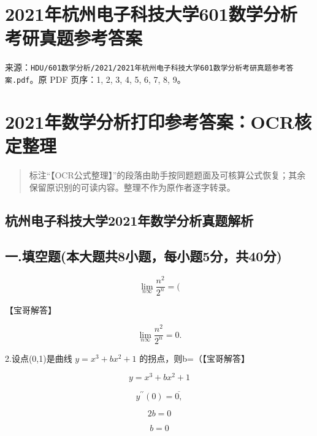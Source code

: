 \documentclass[11pt,fontset=fandol]{ctexart}
\begin{document}
\section{2021年杭州电子科技大学601数学分析考研真题参考答案}\label{ux5e74ux676dux5ddeux7535ux5b50ux79d1ux6280ux5927ux5b66601ux6570ux5b66ux5206ux6790ux8003ux7814ux771fux9898ux53c2ux8003ux7b54ux6848}

来源：\texttt{HDU/601数学分析/2021/2021年杭州电子科技大学601数学分析考研真题参考答案.pdf}。原
PDF 页序：1, 2, 3, 4, 5, 6, 7, 8, 9。

\section{2021年数学分析打印参考答案：OCR核定整理}\label{ux5e74ux6570ux5b66ux5206ux6790ux6253ux5370ux53c2ux8003ux7b54ux6848ocrux6838ux5b9aux6574ux7406}

\begin{quote}
标注``【OCR公式整理】''的段落由助手按同题题面及可核算公式恢复；其余保留原识别的可读内容。整理不作为原作者逐字转录。
\end{quote}

\subsection{杭州电子科技大学2021年数学分析真题解析}\label{ux676dux5ddeux7535ux5b50ux79d1ux6280ux5927ux5b662021ux5e74ux6570ux5b66ux5206ux6790ux771fux9898ux89e3ux6790}

\subsection{一.填空题(本大题共8小题，每小题5分，共40分)}\label{ux4e00.ux586bux7a7aux9898ux672cux5927ux9898ux51718ux5c0fux9898ux6bcfux5c0fux98985ux5206ux517140ux5206}

\[
\lim _ { n  \infty } { \frac { n ^ { 2 } } { 2 ^ { n } } } = (
\]

【宝哥解答】

\[
\lim _ { n  \infty } { \frac { n ^ { 2 } } { 2 ^ { n } } } = 0 .
\]

2.设点(0,1)是曲线 \(y = x ^ { 3 } + b x ^ { 2 } + 1\)
的拐点，则b=（【宝哥解答】

\[
y = x ^ { 3 } + b x ^ { 2 } + 1
\]

\[
y ^ { \prime \prime } ( 0 ) = \overline { { 0 , } }
\]

\[
2 b = 0
\]

\[
b = 0
\]
\end{document}
